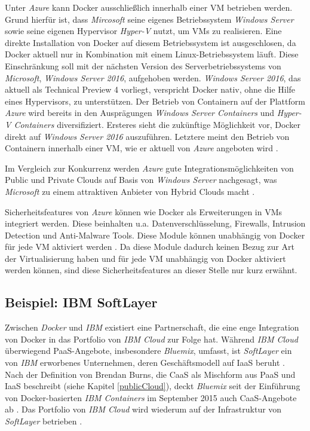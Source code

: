 \documentclass[../main.tex]{subfiles}
\begin{document}
      Unter \emph{Azure} kann Docker ausschließlich innerhalb einer VM betrieben werden. Grund hierfür ist, dass \emph{Mircosoft} seine eigenes Betriebssystem \emph{Windows Server} sowie seine eigenen Hypervisor \emph{Hyper-V} nutzt, um VMs zu realisieren. Eine direkte Installation von Docker auf diesem Betriebssystem ist ausgeschlosen, da Docker aktuell nur in Kombination mit einem Linux-Betriebssystem läuft. Diese Einschränkung soll mit der nächsten Version des Serverbetriebssystems von \emph{Microsoft}, \emph{Windows Server 2016}, aufgehoben werden. \emph{Windows Server 2016}, das aktuell als Technical Preview 4 vorliegt, verspricht Docker nativ, ohne die Hilfe eines Hypervisors, zu unterstützen. Der Betrieb von Containern auf der Plattform \emph{Azure} wird bereits in den Ausprägungen \emph{Windows Server Containers} und \emph{Hyper-V Containers} diversifiziert. Ersteres sieht die zukünftige Möglichkeit vor, Docker direkt auf \emph{Windows Server 2016} auszuführen. Letztere meint den Betrieb von Containern innerhalb einer VM, wie er aktuell von \emph{Azure} angeboten wird \cite{dockerPartnershipMicrosoft}\cite{azureWindowsContainers}.

      Im Vergleich zur Konkurrenz werden \emph{Azure} gute Integrationsmöglichkeiten von Public und Private Clouds auf Basis von \emph{Windows Server} nachgesagt, was \emph{Microsoft} zu einem attraktiven Anbieter von Hybrid Clouds macht \cite{IBMDockerOpenStack}.

      Sicherheitsfeatures von \emph{Azure} können wie Docker als Erweiterungen in VMs integriert werden. Diese beinhalten u.a. Datenverschlüsselung, Firewalls, Intrusion Detection und Anti-Malware Tools. Diese Module können unabhängig von Docker für jede VM aktiviert werden \cite{azureDockerExtensionSecurity}. Da diese Module dadurch keinen Bezug zur Art der Virtualisierung haben und für jede VM unabhängig von Docker aktiviert werden können, sind diese Sicherheitsfeatures an dieser Stelle nur kurz erwähnt.

    \subsection{Beispiel: IBM SoftLayer}
    \label{softlayer}
      Zwischen \emph{Docker} und \emph{IBM} existiert eine Partnerschaft, die eine enge Integration von Docker in das Portfolio von \emph{IBM Cloud} zur Folge hat. Während \emph{IBM Cloud} überwiegend PaaS-Angebote, insbesondere \emph{Bluemix}, umfasst, ist \emph{SoftLayer} ein von \emph{IBM} erworbenes Unternehmen, deren Geschäftsmodell auf IaaS beruht \cite{IBMDockerServices}. Nach der Definition von Brendan Burns, die CaaS als Mischform aus PaaS und IaaS beschreibt (siehe Kapitel \ref{publicCloud}), deckt \emph{Bluemix} seit der Einführung von Docker-basierten \emph{IBM Containers} im September 2015 auch CaaS-Angebote ab \cite{IBMContainerLaunch}. Das Portfolio von \emph{IBM Cloud} wird wiederum auf der Infrastruktur von \emph{SoftLayer} betrieben \cite{IBMPartnershipDocker}.
\end{document}
